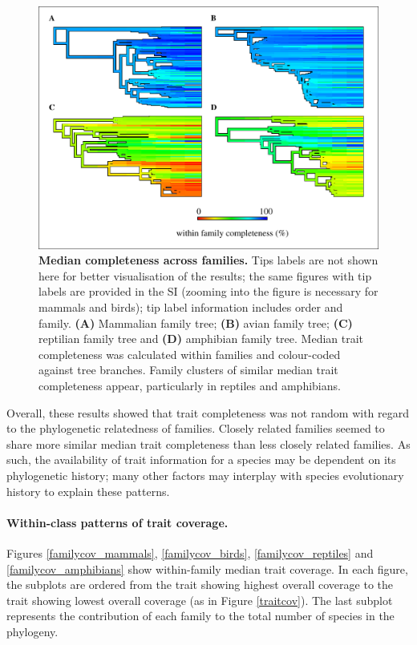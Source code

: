 \begin{figure}[h!]
\centering
\includegraphics[scale=0.75]{figures/chapter2/NA_phylo_patterns/Completeness_all}
\caption[Median completeness across families]{\textbf{Median completeness across families.} Tips labels are not shown here for better visualisation of the results; the same figures with tip labels are provided in the SI (zooming into the figure is necessary for mammals and birds); tip label information includes order and family. \textbf{(A)} Mammalian family tree; \textbf{(B)} avian family tree; \textbf{(C)} reptilian family tree and \textbf{(D)} amphibian family tree. Median trait completeness was calculated within families and colour-coded  against tree branches. Family clusters of similar median trait completeness appear, particularly in reptiles and amphibians.}
\label{classcomp}
\end{figure}

Overall, these results showed that trait completeness was not random with regard to the phylogenetic relatedness of families. Closely related families seemed to share more similar median trait completeness than less closely related families. As such, the availability of trait information for a species may be dependent on its phylogenetic history; many other factors may interplay with species evolutionary history to explain these patterns. 

\paragraph{Within-class patterns of trait coverage.} Figures \ref{familycov_mammals}, \ref{familycov_birds}, \ref{familycov_reptiles} and \ref{familycov_amphibians} show within-family median trait coverage. In each figure, the subplots are ordered from the trait showing highest overall coverage to the trait showing lowest overall coverage (as in Figure \ref{traitcov}). The last subplot represents the contribution of each family to the total number of species in the phylogeny. 


